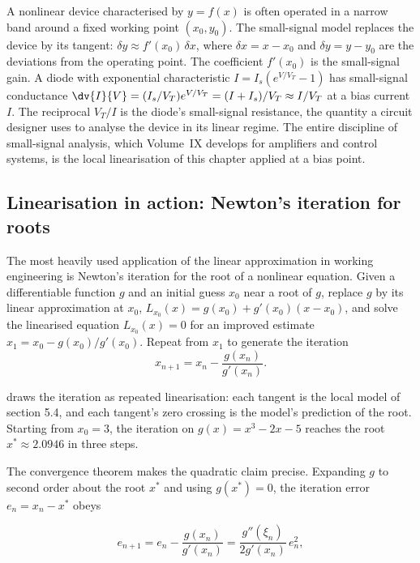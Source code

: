 A nonlinear device characterised by $y = f(x)$ is often operated in
a narrow band around a fixed working point $(x_{0}, y_{0})$. The
small-signal model replaces the device by its tangent: $\delta y
\approx f'(x_{0}) \, \delta x$, where $\delta x = x - x_{0}$ and
$\delta y = y - y_{0}$ are the deviations from the operating point.
The coefficient $f'(x_{0})$ is the small-signal gain. A diode with
exponential characteristic $I = I_{s}(e^{V/V_{T}} - 1)$ has
small-signal conductance $\dv{I}{V} = (I_{s}/V_{T}) e^{V/V_{T}} =
(I + I_{s})/V_{T} \approx I/V_{T}$ at a bias current $I$. The
reciprocal $V_{T}/I$ is the diode's small-signal resistance, the
quantity a circuit designer uses to analyse the device in its
linear regime. The entire discipline of small-signal analysis,
which Volume~IX develops for amplifiers and control systems, is the
local linearisation of this chapter applied at a bias point.

\subsection{Linearisation in action: Newton's iteration for roots}

The most heavily used application of the linear approximation in
working engineering is Newton's iteration for the root of a
nonlinear equation. Given a differentiable function $g$ and an
initial guess $x_{0}$ near a root of $g$, replace $g$ by its
linear approximation at $x_{0}$,
$L_{x_{0}}(x) = g(x_{0}) + g'(x_{0}) (x - x_{0})$, and solve the
linearised equation $L_{x_{0}}(x) = 0$ for an improved estimate
$x_{1} = x_{0} - g(x_{0})/g'(x_{0})$. Repeat from $x_{1}$ to
generate the iteration
\[
x_{n+1} = x_{n} - \frac{g(x_{n})}{g'(x_{n})}.
\]


 draws the iteration as
repeated linearisation: each tangent is the local model of section
5.4, and each tangent's zero crossing is the model's prediction of
the root. Starting from $x_{0} = 3$, the iteration on $g(x) = x^{3}
- 2x - 5$ reaches the root $x^{*} \approx 2.0946$ in three steps.

The convergence theorem makes the quadratic claim precise.
Expanding $g$ to second order about the root $x^{*}$ and using
$g(x^{*}) = 0$, the iteration error $e_{n} = x_{n} - x^{*}$ obeys

\[
e_{n+1} = e_{n} - \frac{g(x_{n})}{g'(x_{n})} =
\frac{g''(\xi_{n})}{2 g'(x_{n})} \, e_{n}^{2},
\]


